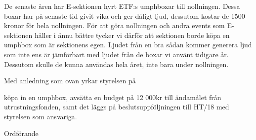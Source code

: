 \documentclass[../_main/handlingar.tex]{subfiles}
\begin{document}

De senaste åren har E-sektionen hyrt ETF:s umphboxar till nollningen. Dessa boxar har på senaste tid givit vika och ger dåligt ljud, dessutom kostar de 1500 kronor för hela nollningen. För att göra nollningen och andra events som E-sektionen håller i ännu bättre tycker vi därför att sektionen borde köpa en umphbox som är sektionens egen. Ljudet från en bra sådan kommer generera ljud som inte ens är jämförbart med ljudet från de boxar vi använt tidigare år. Dessutom skulle de kunna användas hela året, inte bara under nollningen.

Med anledning som ovan yrkar styrelsen på

\begin{attsatser}
    \att köpa in en umphbox,
    \att avsätta en budget på 12 000kr till ändamålet från utrustningsfonden, samt
    \att det läggs på beslutsuppföljningen till HT/18 med styrelsen som ansvariga.
\end{attsatser}

\begin{signatures}{1}
    \ist
    \signature{\ordf}{Ordförande}
\end{signatures}
\end{document}
